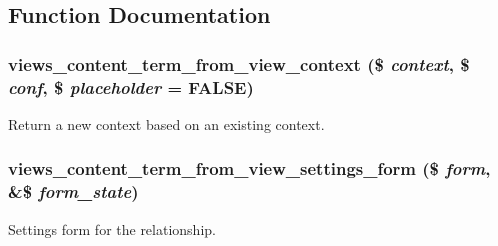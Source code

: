 \subsection{Function Documentation}
\hypertarget{term__from__view_8inc_ae83e9aaa8c6fe1be354f6ba0ead74c89}{
\subsubsection[{views\_\-content\_\-term\_\-from\_\-view\_\-context}]{\setlength{\rightskip}{0pt plus 5cm}views\_\-content\_\-term\_\-from\_\-view\_\-context (\$ {\em context}, \/  \$ {\em conf}, \/  \$ {\em placeholder} = {\ttfamily FALSE})}}
\label{term__from__view_8inc_ae83e9aaa8c6fe1be354f6ba0ead74c89}
Return a new context based on an existing context. \hypertarget{term__from__view_8inc_a87dcdde935c61cb30183a170680e574f}{
\subsubsection[{views\_\-content\_\-term\_\-from\_\-view\_\-settings\_\-form}]{\setlength{\rightskip}{0pt plus 5cm}views\_\-content\_\-term\_\-from\_\-view\_\-settings\_\-form (\$ {\em form}, \/  \&\$ {\em form\_\-state})}}
\label{term__from__view_8inc_a87dcdde935c61cb30183a170680e574f}
Settings form for the relationship. 

